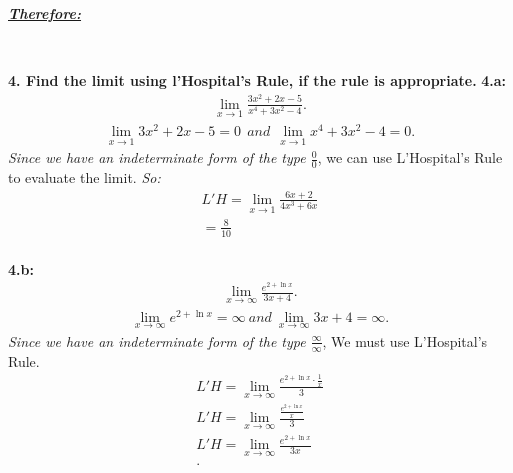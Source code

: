 \documentclass{report}
\begin{document}
\begin{mdframed}
    \bigbreak \noindent 
    \textbf{\textit{\underline{Therefore:}}}
    \begin{center}
      \ \ \ 
    \end{center}
    \end{mdframed}

    \pagebreak \bigbreak \noindent
    \begin{mdframed}
      \textbf{4. Find the limit using l’Hospital’s Rule, if the rule is appropriate.}
      \bigbreak \noindent 
      \hspace{\parindent} \textbf{4.a: }
      \begin{align*}
        \lim_{x \to 1}{\frac{3x^{2}+2x-5}{x^{4}+3x^{2}-4}}
      .\end{align*}
      \begin{align*}
        \lim_{x \to 1}{3x^{2}+2x-5} = 0\ \ and\ \ \lim_{x \to 1}{x^{4}+3x^{2}-4} =0
      .\end{align*}
      \bigbreak \noindent 
      \textit{Since we have an indeterminate form of the type $\frac{0}{0} $}, we can use L'Hospital's Rule to evaluate the limit.
      \bigbreak \noindent
      \textit{So:}
      \begin{align*}
        L'H = \lim_{x \to 1}{\frac{6x+2}{4x^{3}+6x}} \\
        = \frac{8}{10} \\
      \end{align*}
      \begin{center}
        \begin{large}
        \end{large}
      \end{center}

      \bigbreak \noindent 
      \hspace{\parindent} \textbf{4.b:}
      \begin{align*}
        \lim_{x \to \infty}{\frac{e^{2+\ln{x}}}{3x+4}}
      .\end{align*}
      \begin{align*}
        \lim_{x \to \infty}{e^{2+\ln{x}}} = \infty\ and\ \lim_{x \to \infty}{3x+4} = \infty
      .\end{align*}
      \bigbreak \noindent 
      \textit{Since we have an indeterminate form of the type $\frac{\infty}{\infty}$}, We must use L'Hospital's Rule.
      \begin{align*}
        L'H = \lim_{x \to \infty}{\frac{e^{2+\ln{x}}\cdot \frac{1}{x}}{3}} \\
        L'H = \lim_{x \to \infty}{\frac{\frac{e^{2+\ln{x}}}{x}}{3}} \\
        L'H = \lim_{x \to \infty}{\frac{e^{2+\ln{x}}}{3x}} \\
      .\end{align*}


\end{mdframed}
\end{document}
